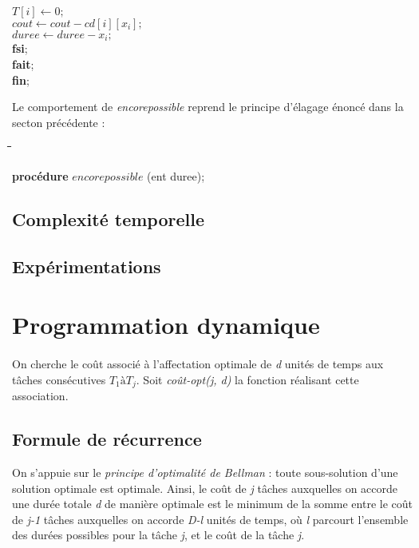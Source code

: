 \documentclass[a4paper, titlepage]{article}
\begin{document}
\begin{tabbing}
			\>\>\> $T[i] \leftarrow 0;$ \\
			\>\>\> $cout \leftarrow cout - cd[i][x_{i}];$ \\
			\>\>\> $duree \leftarrow duree - x_{i};	$ \\
			\>\> \textbf{fsi}; \\
			\> \textbf{fait}; \\
			\textbf{fin};

			\end{tabbing}

			Le comportement de \emph{encorepossible} reprend le principe d'élagage énoncé dans la secton précédente :

			\begin{tabbing}

			\hspace{1cm}\=\hspace{1cm}\=\hspace{1cm}\=\hspace{1cm}\=\hspace{1cm}\=\kill %

			\textbf{procédure} $encorepossible$ (ent duree); \\


			\end{tabbing}


	\subsection{Complexité temporelle}

	\subsection{Expérimentations}

\section{Programmation dynamique}
	\paragraph{}
		On cherche le coût associé à l'affectation optimale de \emph{d} unités de temps aux tâches consécutives $T_{1} à T_{j}$. Soit \emph{coût-opt(j, d)} la fonction réalisant cette association.
		
	\subsection{Formule de récurrence}
		On s'appuie sur le \emph{principe d'optimalité de Bellman} : toute sous-solution d'une solution optimale est optimale. Ainsi, le coût de \emph{j} tâches auxquelles on accorde une durée totale \emph{d} de manière optimale est le minimum de la somme entre le coût de \emph{j-1} tâches auxquelles on accorde \emph{D-l} unités de temps, où \emph{l} parcourt l'ensemble des durées possibles pour la tâche \emph{j}, et le coût de la tâche \emph{j}.
\end{document}
